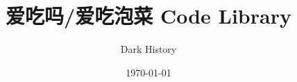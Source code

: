 \documentclass[a4paper]{article}
\begin{document}
\title{\Huge \bf 爱吃吗/爱吃泡菜 Code Library}
\author{Dark History}
\date{\today}

\maketitle

\begin{multicols*}{4}
\tableofcontents
\end{multicols*}

\newpage

\columnseprule=0pt

\begin{multicols*}{2}

\end{multicols*}
\end{document}
